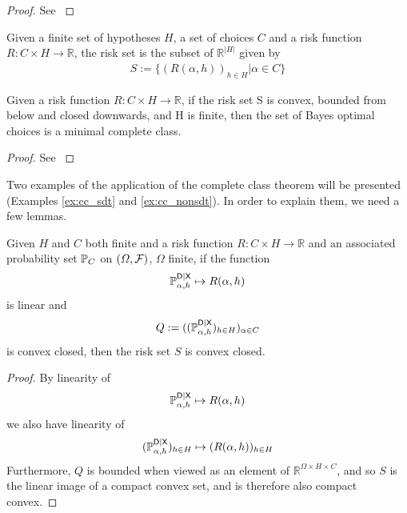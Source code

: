 \begin{proof}
See \citet[Theorem 2.1]{toutenburg_ferguson_1967}
\end{proof}

\begin{definition}
Given a finite set of hypotheses $H$, a set of choices $C$ and a risk function $R:C\times H\to \mathbb{R}$, the risk set is the subset of $\mathbb{R}^{|H|}$ given by
\begin{align}
    S := \{(R(\alpha,h))_{h\in H}|\alpha\in C\}
\end{align}
\end{definition}

\begin{theorem}
Given a risk function $R:C\times H\to \mathbb{R}$, if the risk set S is convex, bounded from below and closed downwards, and H is finite, then the set of Bayes optimal choices is a minimal complete class.
\end{theorem}

\begin{proof}
See \citet[~Theorem 2.10.2]{toutenburg_ferguson_1967}
\end{proof}

Two examples of the application of the complete class theorem will be presented (Examples \ref{ex:cc_sdt} and \ref{ex:cc_nonsdt}). In order to explain them, we need a few lemmas.

\begin{lemma}\label{lem:convex_closed}
Given $H$ and $C$ both finite and a risk function $R:C\times H\to \mathbb{R}$ and an associated probability set $\mathbb{P}_C$ on $(\Omega,\mathcal{F})$, $\Omega$ finite, if the function
\begin{align}
    \mathbb{P}_{\alpha,h}^{\mathsf{D}|\mathsf{X}}\mapsto R(\alpha,h)
\end{align}
is linear and 
\begin{align}
    Q:= ((\mathbb{P}_{\alpha,h}^{\mathsf{D}|\mathsf{X}})_{h\in H})_{\alpha\in C}
\end{align}
is convex closed, then the risk set $S$ is convex closed.
\end{lemma}

\begin{proof}
By linearity of 
\begin{align}
    \mathbb{P}_{\alpha,h}^{\mathsf{D}|\mathsf{X}}\mapsto R(\alpha,h)
\end{align}
we also have linearity of 
\begin{align}
    (\mathbb{P}_{\alpha,h}^{\mathsf{D}|\mathsf{X}})_{h\in H}\mapsto (R(\alpha,h))_{h\in H}
\end{align}
Furthermore, $Q$ is bounded when viewed as an element of $\mathbb{R}^{\Omega\times H\times C}$, and so $S$ is the linear image of a compact convex set, and is therefore also compact convex.
\end{proof}

